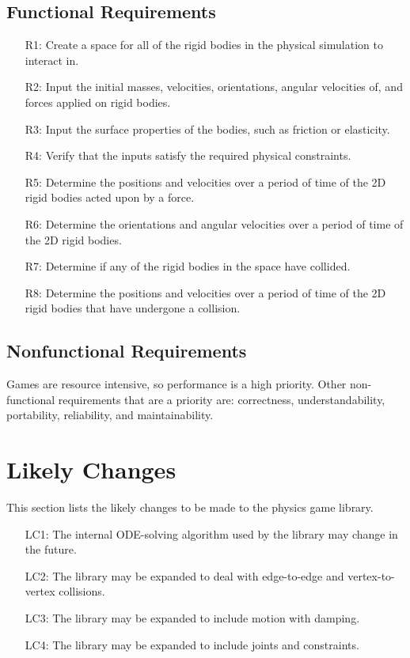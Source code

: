 \documentclass[12pt]{article}
\begin{document}
\subsection{Functional Requirements}
\label{Sec:FR}
\begin{itemize}
\item[R1:]Create a space for all of the rigid bodies in the physical simulation to interact in.
\item[R2:]Input the initial masses, velocities, orientations, angular velocities of, and forces applied on rigid bodies.
\item[R3:]Input the surface properties of the bodies, such as friction or elasticity.
\item[R4:]Verify that the inputs satisfy the required physical constraints.
\item[R5:]Determine the positions and velocities over a period of time of the 2D rigid bodies acted upon by a force.
\item[R6:]Determine the orientations and angular velocities over a period of time of the 2D rigid bodies.
\item[R7:]Determine if any of the rigid bodies in the space have collided.
\item[R8:]Determine the positions and velocities over a period of time of the 2D rigid bodies that have undergone a collision.
\end{itemize}
\subsection{Nonfunctional Requirements}
\label{Sec:NR}
Games are resource intensive, so performance is a high priority. Other non-functional requirements that are a priority are: correctness, understandability, portability, reliability, and maintainability.
\section{Likely Changes}
\label{Sec:LC}
This section lists the likely changes to be made to the physics game library.
\begin{itemize}
\item[LC1:]The internal ODE-solving algorithm used by the library may change in the future.
\item[LC2:]The library may be expanded to deal with edge-to-edge and vertex-to-vertex collisions.
\item[LC3:]The library may be expanded to include motion with damping.
\item[LC4:]The library may be expanded to include joints and constraints.
\end{itemize}
\end{document}
